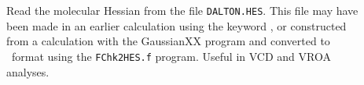 \begin{description}

\item[] Read the molecular Hessian from the file
\verb|DALTON.HES|. This file may have been made in an earlier
calculation using the keyword , or constructed from a
calculation with the GaussianXX program and converted to \dalton\
format using the \verb|FChk2HES.f| program. Useful in VCD and VROA
analyses\index{VCD}\index{ROA}.


\end{description}
